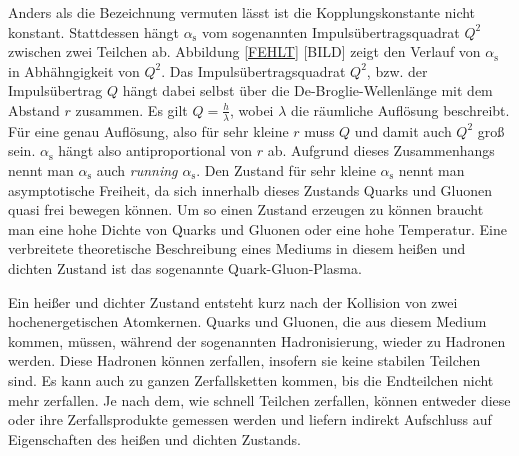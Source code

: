 Anders als die Bezeichnung vermuten l\"asst ist die Kopplungskonstante nicht konstant.
Stattdessen h\"angt $\alpha_\text{s}$ vom sogenannten Impulsübertragsquadrat $Q^{2}$ zwischen zwei Teilchen ab.
Abbildung \ref{FEHLT} [BILD] zeigt den Verlauf von $\alpha_\text{s}$ in Abh\"ahngigkeit von $Q^{2}$.
Das Impulsübertragsquadrat $Q^{2}$, bzw. der Impulsübertrag $Q$ h\"angt dabei selbst \"uber die De-Broglie-Wellenl\"ange mit dem Abstand $r$ zusammen.
Es gilt $Q = \frac{h}{\lambda}$, wobei $\lambda$ die r\"aumliche Aufl\"osung beschreibt.
F\"ur eine genau Aufl\"osung, also f\"ur  sehr kleine $r$ muss $Q$ und damit auch $Q^{2}$ gro{\ss} sein.
$\alpha_\text{s}$ h\"angt also antiproportional von $r$ ab.
Aufgrund dieses Zusammenhangs nennt man $\alpha_\text{s}$ auch \textit{running $\alpha_\text{s}$}. 
Den Zustand f\"ur sehr kleine $\alpha_\text{s}$ nennt man asymptotische Freiheit, da sich innerhalb dieses Zustands Quarks und Gluonen quasi frei bewegen k\"onnen.
Um so einen Zustand erzeugen zu k\"onnen braucht man eine hohe Dichte von Quarks und Gluonen oder eine hohe Temperatur.
Eine verbreitete theoretische Beschreibung eines Mediums in diesem hei{\ss}en und dichten Zustand ist das sogenannte Quark-Gluon-Plasma.

Ein hei{\ss}er und dichter Zustand entsteht kurz nach der Kollision von zwei hochenergetischen Atomkernen.
Quarks und Gluonen, die aus diesem Medium kommen, m\"ussen, w\"ahrend der sogenannten Hadronisierung, wieder zu Hadronen werden.
Diese Hadronen k\"onnen zerfallen, insofern sie keine stabilen Teilchen sind.
Es kann auch zu ganzen Zerfallsketten kommen, bis die Endteilchen nicht mehr zerfallen.
Je nach dem, wie schnell Teilchen zerfallen, k\"onnen entweder diese oder ihre Zerfallsprodukte gemessen werden und liefern indirekt Aufschluss auf Eigenschaften des hei{\ss}en und dichten Zustands.